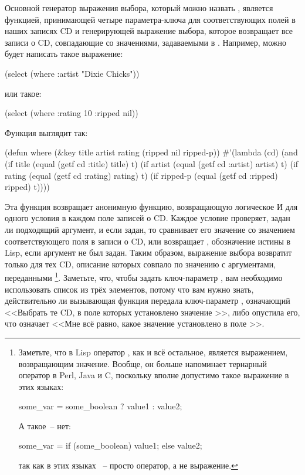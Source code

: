 Основной генератор выражения выбора, который можно назвать , является
функцией, принимающей четыре параметра-ключа для соответствующих полей в наших записях CD
и генерирующей выражение выбора, которое возвращает все записи о CD, совпадающие со
значениями, задаваемыми в . Например, можно будет написать такое выражение:

\begin{myverb}
(select (where :artist "Dixie Chicks"))
\end{myverb}

\noindent{}или такое:

\begin{myverb}
(select (where :rating 10 :ripped nil))
\end{myverb}

Функция выглядит так:

\begin{myverb}
(defun where (&key title artist rating (ripped nil ripped-p))
  #'(lambda (cd)
    (and
      (if title    (equal (getf cd :title)  title)  t)
      (if artist   (equal (getf cd :artist) artist) t)
      (if rating   (equal (getf cd :rating) rating) t)
      (if ripped-p (equal (getf cd :ripped) ripped) t))))
\end{myverb}

Эта функция возвращает анонимную функцию, возвращающую логическое И для одного условия в
каждом поле записей о CD. Каждое условие проверяет, задан ли подходящий аргумент, и если
задан, то сравнивает его значение со значением соответствующего поля в записи о CD, или
возвращает , обозначение истины в Lisp, если аргумент не был задан. Таким образом,
выражение выбора возвратит  только для тех CD, описание которых совпало по
значению с аргументами, переданными \footnote{Заметьте, что в Lisp оператор
  , как и всё остальное, является выражением, возвращающим значение. Вообще, он
  больше напоминает тернарный оператор  в Perl, Java и C, поскольку вполне
  допустимо такое выражение в этих языках:

\begin{myverb}[language=c]
some_var = some_boolean ? value1 : value2;
\end{myverb}

\noindent{}А такое~-- нет:
\begin{myverb}[language=C]
some_var = if (some_boolean) value1; else value2;
\end{myverb}

\noindent{}так как в этих языках ~-- просто оператор, а не выражение.}. Заметьте, что,
чтобы задать ключ-параметр , вам необходимо использовать список из трёх
элементов, потому что вам нужно знать, действительно ли вызывающая функция передала
ключ-параметр , означающий <<Выбрать те CD, в поле  которых
установлено значение >>, либо опустила его, что означает <<Мне всё равно, какое
значение установлено в поле >>.

